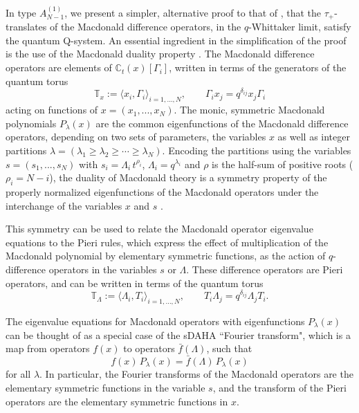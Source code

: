 \documentclass[12pt]{amsart}
\newcommand{\C}{{\mathbb C}}
\newcommand{\lL}{{\Lambda}}
\numberwithin{equation}{section}
\begin{document}
%
%

%


In type $A_{N-1}^{(1)}$, we present a simpler, alternative proof to that of \cite{DFK15}, that the $\tau_+$-translates of the Macdonald difference operators, in the $q$-Whittaker limit, satisfy the quantum Q-system. An essential ingredient in the simplification of the proof is the use of the Macdonald duality property \cite{macdo}.
%
The Macdonald difference operators
are elements of $\C_t(x)[\Gamma_i]$, written in terms of the generators of the quantum torus
\begin{equation}\label{qtorx}
\mathbb T_x:= \langle x_i, \Gamma_i\rangle_{i=1,...,N}, \qquad \Gamma_i x_j = q^{\delta_{ij}} x_j \Gamma_i 
\end{equation}
acting on functions of $x=(x_1,...,x_N)$. The monic, symmetric Macdonald polynomials $P_\lambda(x)$ are the common eigenfunctions of the Macdonald difference operators, depending on two sets of parameters, the variables $x$ as well as integer partitions $\lambda=(\lambda_1\geq \lambda_2\geq \cdots \geq \lambda_N)$. 
Encoding the partitions using the variables $s=(s_1,...,s_N)$ with $s_i=\lL_i\, t^{\rho_i}$, $\Lambda_i=q^{\lambda_i}$ and $\rho$ is the half-sum of positive roots ($\rho_i=N-i$),
the duality of Macdonald theory is a symmetry property of the properly normalized eigenfunctions of the Macdonald operators under the interchange of the variables $x$ and $s$ \cite{macdo,vDselfdual,Cherednik95}. 

This symmetry can  be used to relate the Macdonald operator eigenvalue equations to the Pieri rules, which express the effect of multiplication of the Macdonald polynomial by elementary symmetric functions, as the action of $q$-difference operators
in the variables $s$ or $\Lambda$. These difference operators are Pieri operators, and can be written in terms of the quantum torus
\begin{equation}\label{qtorlambda}
\mathbb T_\Lambda:=\langle\Lambda_i
%
, T_i\rangle_{i=1,...,N},\qquad T_i \Lambda_j = q^{\delta_{ij}} \Lambda_j T_i .
\end{equation} 

The eigenvalue equations for Macdonald operators 
with eigenfunctions $P_\lambda(x)$ can be thought of as a special case of the sDAHA ``Fourier transform",
which is a map from operators $f(x)$ to operators $\bar f(\lL)$, such that
\begin{equation}\label{FT} f(x)\,P_\lambda(x)=\bar f(\lL)\, P_\lambda(x) \end{equation}
for all $\lambda$. In particular, the Fourier transforms of the Macdonald operators are the elementary symmetric functions in the variable $s$, and the transform of the
Pieri operators are the elementary symmetric functions in $x$.
\end{document}
